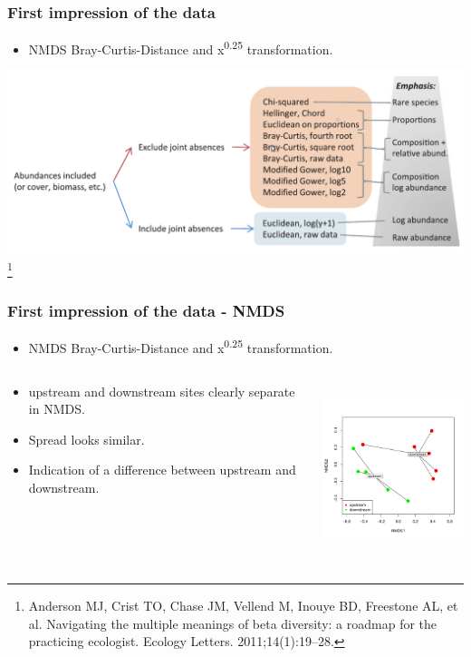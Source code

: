 \documentclass[10pt]{beamer}\usepackage[]{graphicx}\usepackage[]{color}
\newenvironment{knitrout}{}{} %
\renewcommand{\footnotesize}{\scriptsize}
\begin{document}
\begin{frame}[fragile]
\frametitle{First impression of the data}
\begin{itemize}
  \item NMDS Bray-Curtis-Distance and x\textsuperscript{0.25} transformation. 
\end{itemize}
  \includegraphics[width=.9\linewidth]{dt.png}
  \footnote{Anderson MJ, Crist TO, Chase JM, Vellend M, Inouye BD, Freestone AL, et al. Navigating the multiple meanings of beta diversity: a roadmap for the practicing ecologist. Ecology Letters. 2011;14(1):19–28. }
\end{frame}

\begin{frame}[fragile]
\frametitle{First impression of the data - NMDS}
\begin{itemize}
  \item NMDS Bray-Curtis-Distance and x\textsuperscript{0.25} transformation. 
\end{itemize}

 \begin{columns}
  \begin{column}{5cm}
    \begin{itemize}
    \item upstream and downstream sites clearly separate in NMDS.
    \item Spread looks similar.
    \item Indication of a difference between upstream and downstream.
    \end{itemize}
  \end{column}
  \begin{column}{5cm}
\begin{knitrout}\footnotesize
{}\color{fgcolor}

{\centering \includegraphics[width=5cm,height=5cm]{figs/nmds2_plot-1} 

}



\end{knitrout}
    \end{column}
  \end{columns}
\end{frame}
\end{document}
